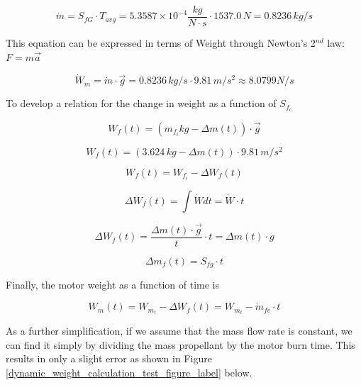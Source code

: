 \documentclass[]{book}
\begin{document}
\begin{equation}
\dot{m} = S_{fG} \cdot T_{avg} = 5.3587 \times 10^{-4} \dfrac{kg}{N \cdot s} \cdot 1537.0 \, N  = 0.8236 \, kg/s 
\end{equation}

This equation can be expressed in terms of Weight through Newton's
2\(^{nd}\) law: \(F = m\vec{a}\)

\begin{equation}
\dot{W}_m = \dot{m} \cdot \vec{g} = 0.8236 \, kg/s \cdot 9.81 \, m/s^2 \approx 8.0799 N/s 
\end{equation}

To develop a relation for the change in weight as a function of
\(S_{f_c}\)

\begin{equation} 
W_f(t) = (m_{f_i} kg - \Delta m(t)) \cdot \vec{g} 
\end{equation}

\begin{equation}
W_f(t) = (3.624 \, kg - \Delta m(t)) \cdot 9.81 \, m/s^2 
\end{equation}

\begin{equation}
W_f(t) = W_{f_i} - \Delta W_f(t)
\end{equation}

\begin{equation}
\Delta W_f (t) = \int \dot{W} dt = \dot{W}\cdot t
\end{equation}

\begin{equation}
\Delta W_f (t) = \dfrac{\Delta m(t) \cdot \vec{g}}{t}\cdot t = \Delta m (t) \cdot g 
\end{equation}

\begin{equation}
\Delta m_f(t) = S_{fg} \cdot t
\end{equation}

Finally, the motor weight as a function of time is

\begin{equation}
W_m (t) = W_{m_t} - \Delta W_f(t) = W_{m_t} - \dot{m}_{fc} \cdot t
\end{equation}

As a further simplification, if we assume that the mass flow rate is
constant, we can find it simply by dividing the mass propellant by the
motor burn time. This results in only a slight error as shown in Figure
\ref{dynamic_weight_calculation_test_figure_label} below.
\end{document}
